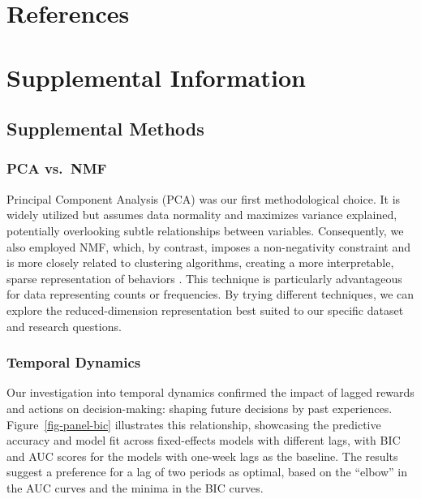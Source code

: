 \documentclass[
  number,
  preprint,
  3p,
  onecolumn]{elsarticle}
\begin{document}
\section{References}\label{references}

\renewcommand{\bibsection}{}


\newpage{}

\section{Supplemental Information}\label{supplemental-information}

\subsection{Supplemental Methods}\label{supplemental-methods}

\subsubsection{PCA vs.~NMF}\label{pca-vs.-nmf}

Principal Component Analysis (PCA) was our first methodological choice.
It is widely utilized but assumes data normality \citep{jolliffe2016}
and maximizes variance explained, potentially overlooking subtle
relationships between variables. Consequently, we also employed NMF,
which, by contrast, imposes a non-negativity constraint and is more
closely related to clustering algorithms, creating a more interpretable,
sparse representation of behaviors \citep{ding2005, lee1999}. This
technique is particularly advantageous for data representing counts or
frequencies. By trying different techniques, we can explore the
reduced-dimension representation best suited to our specific dataset and
research questions.

\subsubsection{Temporal Dynamics}\label{temporal-dynamics}

Our investigation into temporal dynamics confirmed the impact of lagged
rewards and actions on decision-making: shaping future decisions by past
experiences. Figure~\ref{fig-panel-bic} illustrates this relationship,
showcasing the predictive accuracy and model fit across fixed-effects
models with different lags, with BIC and AUC scores for the models with
one-week lags as the baseline. The results suggest a preference for a
lag of two periods as optimal, based on the ``elbow'' in the AUC curves
and the minima in the BIC curves.
\end{document}
